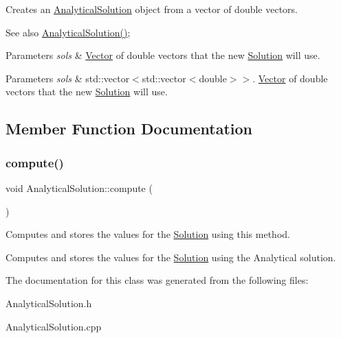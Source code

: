 Creates an \hyperlink{class_analytical_solution}{Analytical\+Solution} object from a vector of double vectors. \begin{DoxySeeAlso}{See also}
\hyperlink{class_analytical_solution_a92a4ce87e863ec7f8aac59372306efd2}{Analytical\+Solution()}; 
\end{DoxySeeAlso}

\begin{DoxyParams}{Parameters}
{\em sols} & \hyperlink{class_vector}{Vector} of double vectors that the new \hyperlink{class_solution}{Solution} will use. \\
\hline
\end{DoxyParams}

\begin{DoxyParams}{Parameters}
{\em sols} & std\+::vector$<$std\+::vector$<$double$>$$>$. \hyperlink{class_vector}{Vector} of double vectors that the new \hyperlink{class_solution}{Solution} will use. \\
\hline
\end{DoxyParams}


\subsection{Member Function Documentation}
\mbox{\label{class_analytical_solution_ae1ebc556a8dfed55b6c463625545d919}} 
\subsubsection{\texorpdfstring{compute()}{compute()}}
{\footnotesize\ttfamily void Analytical\+Solution\+::compute (\begin{DoxyParamCaption}{ }\end{DoxyParamCaption})}

Computes and stores the values for the \hyperlink{class_solution}{Solution} using this method.

Computes and stores the values for the \hyperlink{class_solution}{Solution} using the Analytical solution. 

The documentation for this class was generated from the following files\+:\begin{DoxyCompactItemize}
\item 
Analytical\+Solution.\+h\item 
Analytical\+Solution.\+cpp\end{DoxyCompactItemize}
